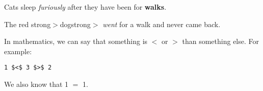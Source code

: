 \documentclass[11pt]{article}
\begin{document}
    
Cats sleep \textit{furiously} after they have been for \textbf{walks}.
    
The red strong$>$dogstrong$>$ \textit{went} for a walk and never came back.
    
In mathematics, we can say that something is $<$ or $>$ than something else. For example:
\begin{verbatim}1 $<$ 3 $>$ 2\end{verbatim}    
We also know that 1 $=$ 1.
\end{document}
